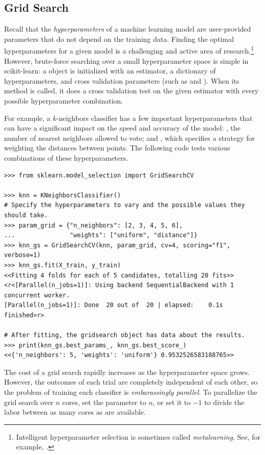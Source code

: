 \subsection*{Grid Search} %

Recall that the \emph{hyperparameters} of a machine learning model are user-provided parameters that do not depend on the training data.
Finding the optimal hyperparameters for a given model is a challenging and active area of research.\footnote{Intelligent hyperparameter selection is sometimes called \emph{metalearning}.
See, for example, \cite{schoenfeld2018preprocessor}.}
However, brute-force searching over a small hyperparameter space is simple in scikit-learn: a  object is initialized with an estimator, a dictionary of hyperparameters, and cross validation parameters (such as  and ).
When its  method is called, it does a cross validation test on the given estimator with every possible hyperparameter combination.

For example, a $k$-neighbors classifier has a few important hyperparameters that can have a significant impact on the speed and accuracy of the model: , the number of nearest neighbors allowed to vote; and , which specifies a strategy for weighting the distances between points.
The following code tests various combinations of these hyperparameters.

\begin{lstlisting}
>>> from sklearn.model_selection import GridSearchCV

>>> knn = KNeighborsClassifier()
# Specify the hyperparameters to vary and the possible values they should take.
>>> param_grid = {"n_neighbors": [2, 3, 4, 5, 6],
...               "weights": ["uniform", "distance"]}
>>> knn_gs = GridSearchCV(knn, param_grid, cv=4, scoring="f1", verbose=1)
>>> knn_gs.fit(X_train, y_train)
<<Fitting 4 folds for each of 5 candidates, totalling 20 fits>>
<r<[Parallel(n_jobs=1)]: Using backend SequentialBackend with 1 concurrent worker.
[Parallel(n_jobs=1)]: Done  20 out of  20 | elapsed:    0.1s finished>r>

# After fitting, the gridsearch object has data about the results.
>>> print(knn_gs.best_params_, knn_gs.best_score_)
<<{'n_neighbors': 5, 'weights': 'uniform'} 0.9532526583188765>>
\end{lstlisting}

The cost of a grid search rapidly increases as the hyperparameter space grows. However, the outcomes of each trial are completely independent of each other, so the problem of training each classifier is \emph{embarassingly parallel}.
To parallelize the grid search over $n$ cores, set the  parameter to $n$, or set it to $-1$ to divide the labor between as many cores as are available.

